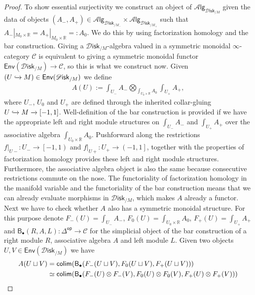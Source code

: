 \documentclass[12pt,a4paper]{article}
\theoremstyle{definition}
\theoremstyle{plain}
\theoremstyle{remark}
\newcommand{\catC}{\mathscr{C}}
\newcommand{\disk}{\mathscr{D} \mathsf{isk}}
\newcommand{\alg}[1]{\mathscr{A} \mathsf{lg}_{#1}}
\begin{document}
\begin{proof}
    To show essential surjectivity we construct an object of $\alg{\disk_{/M}}$ given the data of objects $(A_-, A_+) \in \alg{\disk_{/M_-}} \times \alg{\disk_{/M_+}}$ such that $A_-|_{M_0 \times \mathbb{R}} = A_+|_{M_0 \times \mathbb{R}} = : A_0$. We do this by using factorization homology and the bar construction. Giving a $\disk_{/M}$-algebra valued in a symmetric monoidal $\infty$-category $\catC$ is equivalent to giving a symmetric monoidal functor $\mathsf{Env}(\disk_{/M}) \rightarrow \catC$, so this is what we construct now. Given $(U \xhookrightarrow{} M) \in \mathsf{Env}(\disk_{/M})$ we define
    \begin{align}\label{eq:def_of_A_in_proof}
        A(U) := \int_{U_-} A_- \bigotimes\limits_{\int_{U_0 \times \mathbb{R}} A_0} \int_{U_+} A_+,
    \end{align}
    where $U_-$, $U_0$ and $U_+$ are defined through the inherited collar-gluing $U \xhookrightarrow{} M \xrightarrow{} [-1,1]$. Well-definition of the bar construction is provided if we have the appropriate left and right module structures on $\int_{U_-} A_-$ and $\int_{U_+} A_+$ over the associative algebra $\int_{U_0 \times \mathbb{R}} A_0$. Pushforward along the restrictions $f|_{U-}: U_- \rightarrow \left[-1, 1\right)$ and $f|_{U+}: U_+ \rightarrow \left(-1, 1\right]$, together with the properties of factorization homology provides these left and right module structures. Furthermore, the associative algebra object is also the same because consecutive restrictions commute on the nose. The functoriality of factorization homology in the manifold variable and the functoriality of the bar construction means that we can already evaluate morphisms in $\disk_{/M}$, which makes $A$ already a functor. Next we have to check whether $A$ also has a symmetric monoidal structure. For this purpose denote $F_-(U) = \int_{U_-} A_-$, $F_0(U) = \int_{U_0 \times \mathbb{R}} A_0$, $F_+(U) = \int_{U_+} A_+$ and $\mathsf{B}_{\bullet} (R, A, L):\Delta^{\mathsf{op}} \rightarrow \catC$ for the simplicial object of the bar construction of a right module $R$, associative algebra $A$ and left module $L$. Given two objects $U, V \in \mathsf{Env}(\disk_{/M})$ we have 
    \begin{align}
        A(U \sqcup V) &= \mathsf{colim} (\mathsf{B}_{\bullet} (F_-(U \sqcup V), F_0(U \sqcup V), F_+(U \sqcup V)))\notag\\
        &\simeq \mathsf{colim} (\mathsf{B}_{\bullet} (F_-(U) \otimes F_-(V), F_0(U) \otimes F_0(V), F_+(U) \otimes F_+(V)))\notag\\

\end{align}
\end{proof}
\end{document}
